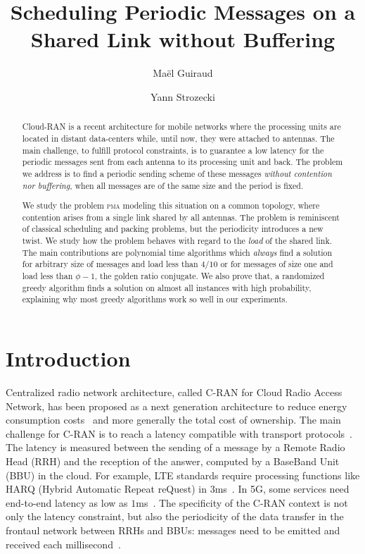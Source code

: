 \documentclass[a4paper,UKenglish,cleveref, autoref, thm-restate]{lipics-v2019}
\title{Scheduling Periodic Messages on a Shared Link without Buffering} %
\author{Ma\"el Guiraud}{CESI, France \and Nokia Bell Labs, France}{mael.guiraud@uvsq.fr}{}{}
\author{Yann Strozecki}{David Laboratory, UVSQ, France }{yann.strozecki@uvsq.fr}{}{}%
\newcommand\pma{\textsc{pma}\xspace}
\begin{document}
\maketitle


\begin{abstract}
Cloud-RAN is a recent architecture for mobile networks where the processing units are located in distant data-centers while, until now, they were attached to antennas. The main challenge, to fulfill protocol constraints, is to guarantee a low latency for the periodic messages sent from each antenna to its processing unit and back. The problem we address is to find a periodic sending scheme of these messages \emph{without contention nor buffering}, when all messages are of the same size and the period is fixed.

We study the problem \pma modeling this situation on a common topology, where contention arises from a single link shared by all antennas. The problem is reminiscent of classical scheduling and packing problems, but the periodicity introduces a new twist. We study how the problem behaves with regard to the \emph{load} of the shared link. 
The main contributions are polynomial time algorithms which \emph{always} find a solution for arbitrary size of messages and load less than $4/10$ or for messages of size one and load less than $\phi - 1$, the golden ratio conjugate. We also prove that, a randomized greedy algorithm finds a solution on almost all instances with high probability, explaining why most greedy algorithms work so well in our experiments.
\end{abstract}


\section{Introduction}

Centralized radio network architecture, called C-RAN for Cloud Radio Access Network, has been proposed as a next generation architecture to reduce energy consumption costs~\cite{gavrilovska2020cloud,mobile2011c,checko2014cloud} and more generally the total cost of ownership. The main challenge for C-RAN is to reach a latency compatible with transport protocols~\cite{ieeep802}. The latency is measured between the sending of a message by a Remote Radio Head (RRH) and the reception of the answer, computed by a BaseBand Unit (BBU) in the cloud. For example, LTE standards require processing functions like HARQ (Hybrid Automatic Repeat reQuest) in $3$ms~\cite{bouguen2012lte}. In 5G, some services need end-to-end latency as low as $1$ms~\cite{dogra2020survey,boccardi2014five}. The specificity of the C-RAN context is not only the latency constraint, but also the periodicity of the data transfer in the frontaul network between RRHs and BBUs: messages need to be emitted and received each millisecond~\cite{3gpp5g,bouguen2012lte}. 
\end{document}
